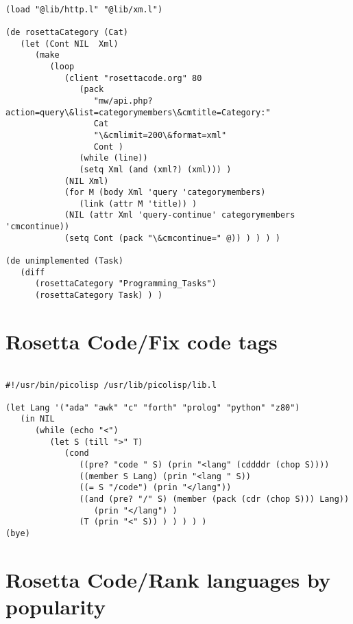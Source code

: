 \begin{verbatim}

(load "@lib/http.l" "@lib/xm.l")

(de rosettaCategory (Cat)
   (let (Cont NIL  Xml)
      (make
         (loop
            (client "rosettacode.org" 80
               (pack
                  "mw/api.php?action=query\&list=categorymembers\&cmtitle=Category:"
                  Cat
                  "\&cmlimit=200\&format=xml"
                  Cont )
               (while (line))
               (setq Xml (and (xml?) (xml))) )
            (NIL Xml)
            (for M (body Xml 'query 'categorymembers)
               (link (attr M 'title)) )
            (NIL (attr Xml 'query-continue' categorymembers 'cmcontinue))
            (setq Cont (pack "\&cmcontinue=" @)) ) ) ) )

(de unimplemented (Task)
   (diff
      (rosettaCategory "Programming_Tasks")
      (rosettaCategory Task) ) )

\end{verbatim}

\section*{Rosetta Code/Fix code tags}

\begin{verbatim}

#!/usr/bin/picolisp /usr/lib/picolisp/lib.l

(let Lang '("ada" "awk" "c" "forth" "prolog" "python" "z80")
   (in NIL
      (while (echo "<")
         (let S (till ">" T)
            (cond
               ((pre? "code " S) (prin "<lang" (cddddr (chop S))))
               ((member S Lang) (prin "<lang " S))
               ((= S "/code") (prin "</lang"))
               ((and (pre? "/" S) (member (pack (cdr (chop S))) Lang))
                  (prin "</lang") )
               (T (prin "<" S)) ) ) ) ) )
(bye)

\end{verbatim}

\section*{Rosetta Code/Rank languages by popularity}

